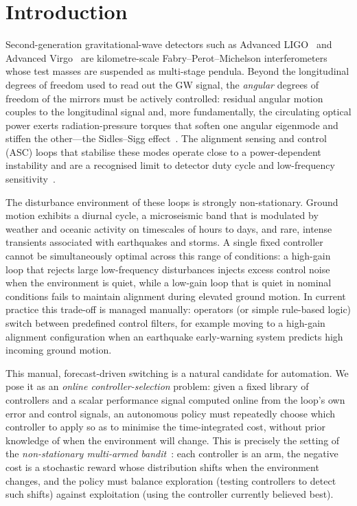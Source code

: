 \documentclass[11pt,a4paper]{article}
\begin{document}
\section{Introduction}\label{sec:intro}
Second-generation gravitational-wave detectors such as Advanced
LIGO~\cite{aLIGO} and Advanced Virgo~\cite{aVirgo} are kilometre-scale
Fabry--Perot--Michelson interferometers whose test masses are suspended as
multi-stage pendula. Beyond the longitudinal degrees of freedom used to read out
the GW signal, the \emph{angular} degrees of freedom of the mirrors must be
actively controlled: residual angular motion couples to the longitudinal
signal and, more fundamentally, the circulating optical power exerts
radiation-pressure torques that soften one angular eigenmode and stiffen the
other---the Sidles--Sigg effect~\cite{SidlesSigg}. The alignment sensing and
control (ASC) loops that stabilise these modes operate close to a
power-dependent instability and are a recognised limit to detector duty cycle
and low-frequency sensitivity~\cite{Barsotti}.

The disturbance environment of these loops is strongly non-stationary. Ground
motion exhibits a diurnal cycle, a microseismic band that is modulated by
weather and oceanic activity on timescales of hours to days, and rare, intense
transients associated with earthquakes and storms. A single fixed controller
cannot be simultaneously optimal across this range of conditions: a high-gain
loop that rejects large low-frequency disturbances injects excess control
noise when the environment is quiet, while a low-gain loop that is quiet in
nominal conditions fails to maintain alignment during elevated ground motion.
In current practice this trade-off is managed manually: operators (or simple
rule-based logic) switch between predefined control filters, for example moving
to a high-gain alignment configuration when an earthquake early-warning system
predicts high incoming ground motion.

This manual, forecast-driven switching is a natural candidate for automation. We
pose it as an \emph{online controller-selection} problem: given a fixed library
of controllers and a scalar performance signal computed online from the loop's
own error and control signals, an autonomous policy must repeatedly choose which
controller to apply so as to minimise the time-integrated cost, without prior
knowledge of when the environment will change. This is precisely the setting of
the \emph{non-stationary multi-armed bandit}~\cite{Lattimore,GarivierMoulines,
AdSwitch}: each controller is an arm, the negative cost is a stochastic reward
whose distribution shifts when the environment changes, and the policy must
balance exploration (testing controllers to detect such shifts) against
exploitation (using the controller currently believed best).
\end{document}

